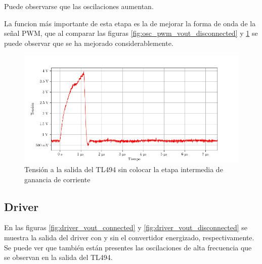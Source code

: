 Puede observarse que las oscilaciones aumentan. %

La funcion más importante de esta etapa es la de mejorar la forma de onda de la señal PWM, que al comparar las figuras \ref{fig:osc_pwm_vout_disconnected} y \ref{fig:pwm_vout_sin_bjt} se puede observar que se ha mejorado considerablemente.

\begin{figure}[H]
    \centering
    \includegraphics[width=\textwidth]{images/capturas-osciloscopio/TL494/pwm_vout_sin_bjt.png}
    \caption{Tensión a la salida del TL494 sin colocar la etapa intermedia de ganancia de corriente}
    \label{fig:pwm_vout_sin_bjt}
\end{figure}






\subsection{Driver}

En las figuras \ref{fig:driver_vout_connected} y \ref{fig:driver_vout_disconnected} se muestra la salida del driver con y sin el convertidor energizado, respectivamente.
Se puede ver que también están presentes las oscilaciones de alta frecuencia que se observan en la salida del TL494.

